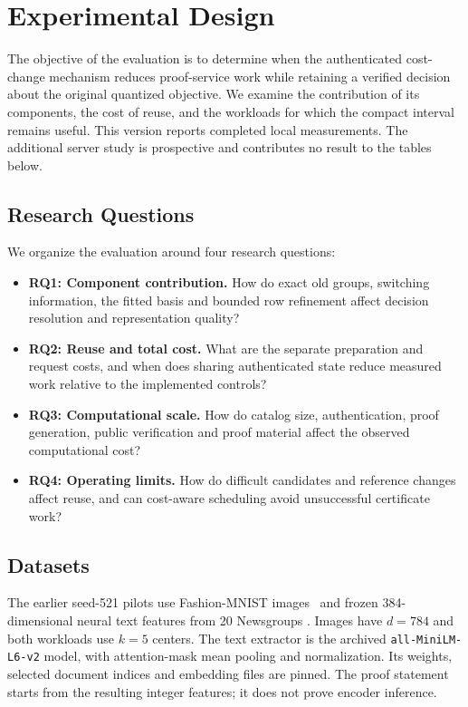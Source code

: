 \section{Experimental Design}
\label{sec:experimental-design}
The objective of the evaluation is to determine when the authenticated
cost-change mechanism reduces proof-service work while retaining a verified
decision about the original quantized objective. We examine the contribution
of its components, the cost of reuse, and the workloads for which the compact
interval remains useful. This version reports completed local measurements.
The additional server study is prospective and contributes no result to
the tables below.

\subsection{Research Questions}
\label{sec:ccd-research-questions}
We organize the evaluation around four research questions:
\begin{itemize}[leftmargin=*]
\item \textbf{RQ1: Component contribution.}
How do exact old groups, switching information, the fitted basis and bounded
row refinement affect decision resolution and representation quality?
\item \textbf{RQ2: Reuse and total cost.}
What are the separate preparation and request costs, and when does sharing
authenticated state reduce measured work relative to the implemented controls?
\item \textbf{RQ3: Computational scale.}
How do catalog size, authentication, proof generation, public verification
and proof material affect the observed computational cost?
\item \textbf{RQ4: Operating limits.}
How do difficult candidates and reference changes affect reuse, and can
cost-aware scheduling avoid unsuccessful certificate work?
\end{itemize}

\subsection{Datasets}
\label{sec:ccd-datasets}
The earlier seed-521 pilots use Fashion-MNIST images~\cite{fashion2017} and frozen
384-dimensional neural text features from 20 Newsgroups
\cite{news20data,minilmcard2026}. Images have $d=784$ and both workloads use
$k=5$ centers. The text extractor is the archived
\texttt{all-MiniLM-L6-v2} model, with attention-mask mean pooling and
normalization. Its weights, selected document indices and embedding files
are pinned. The proof statement starts from the resulting integer features;
it does not prove encoder inference.

